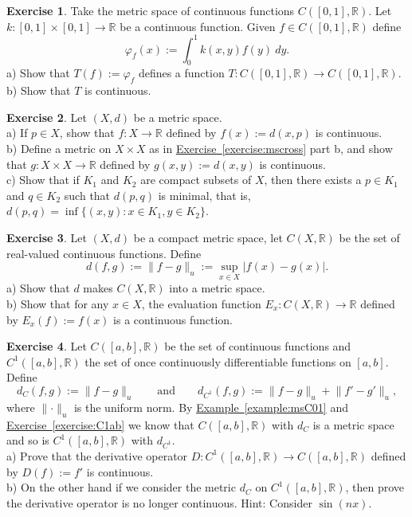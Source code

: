 \documentclass[12pt]{book}
\newcommand{\snorm}[1]{\lVert {#1} \rVert}
\newcommand{\abs}[1]{\left\lvert {#1} \right\rvert}
\newcommand{\R}{{\mathbb{R}}}
\theoremstyle{plain}
\theoremstyle{remark}
\theoremstyle{definition}
\theoremstyle{exercise}
\newtheorem{exercise}{Exercise}[section]
\theoremstyle{example}
\newcommand{\exerciseref}[1]{\hyperref[#1]{Exercise~\ref*{#1}}}
\newcommand{\exampleref}[1]{\hyperref[#1]{Example~\ref*{#1}}}
\begin{document}
\begin{exercise}
Take the metric space of continuous functions $C([0,1],\R)$.  Let
$k \colon [0,1] \times [0,1] \to \R$ be a continuous function.
Given $f \in C([0,1],\R)$ define
\begin{equation*}
\varphi_f(x) := \int_0^1 k(x,y) f(y) ~dy .
\end{equation*}
a) Show that $T(f) := \varphi_f$ defines a function $T \colon C([0,1],\R) \to
C([0,1],\R)$.
\\
b) Show that $T$ is continuous.
\end{exercise}

\begin{exercise}
Let $(X,d)$ be a metric space.\\
a) If $p \in X$,
show that $f \colon X \to \R$ defined
by $f(x) := d(x,p)$ is continuous.
\\
b) Define a metric on $X \times X$ as in \exerciseref{exercise:mscross} part
b, and show that $g \colon X \times X \to \R$ defined by
$g(x,y) := d(x,y)$ is continuous.
\\
c) Show that if $K_1$ and $K_2$ are compact subsets of $X$, then
there exists a $p \in K_1$ and $q \in K_2$ such that $d(p,q)$ is minimal,
that is, $d(p,q) = \inf \{ (x,y) \colon x \in K_1, y \in K_2 \}$.
\end{exercise}

\begin{exercise}
Let $(X,d)$ be a compact metric space, let $C(X,\R)$ be the set
of real-valued continuous functions.  Define
\begin{equation*}
d(f,g) := \snorm{f-g}_u := \sup_{x \in X} \abs{f(x)-g(x)} .
\end{equation*}
a) Show that $d$ makes $C(X,\R)$ into a metric space.\\
b) Show that for any $x \in X$, the evaluation function
$E_x \colon C(X,\R) \to \R$ defined by $E_x(f) := f(x)$
is a continuous function.
\end{exercise}

\begin{exercise}
Let $C([a,b],\R)$ be the set of continuous functions and
$C^1([a,b],\R)$ the set of once continuously differentiable
functions on $[a,b]$.
Define
\begin{equation*}
d_{C}(f,g) := \snorm{f-g}_u
\qquad \text{and} \qquad
d_{C^1}(f,g) := \snorm{f-g}_u + \snorm{f'-g'}_u,
\end{equation*}
where $\snorm{\cdot}_u$ is the uniform norm.
By \exampleref{example:msC01} and \exerciseref{exercise:C1ab} we know that
$C([a,b],\R)$ with $d_C$ is a metric space and
so is
$C^1([a,b],\R)$ with $d_{C^1}$.\\
a) Prove that the derivative operator $D \colon 
C^1([a,b],\R) \to C([a,b],\R)$ defined by
$D(f) := f'$ is continuous.
\\
b) On the other hand if we consider the metric $d_C$ on $C^1([a,b],\R)$,
then prove the derivative operator is no longer continuous.  Hint: Consider
$\sin(n x)$.
\end{exercise}
\end{document}
